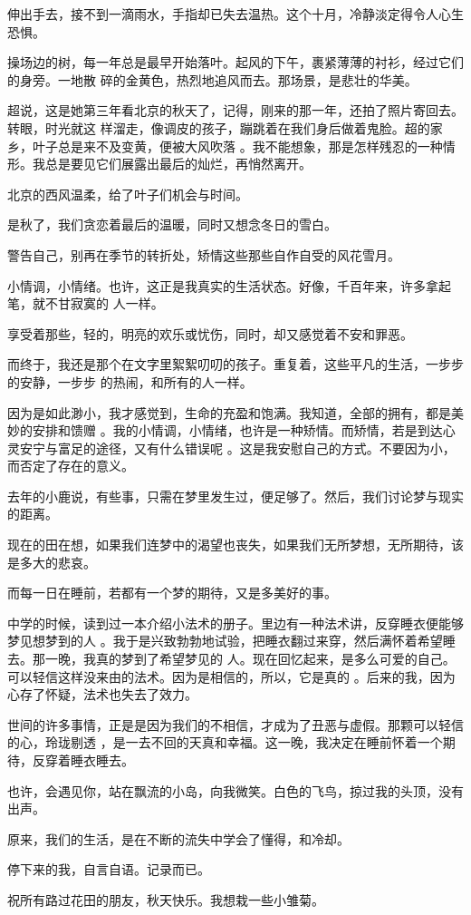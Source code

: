 \documentclass[12pt,a4paper]{article}
\begin{document}
		伸出手去，接不到一滴雨水，手指却已失去温热。这个十月，冷静淡定得令人心生恐惧。

		操场边的树，每一年总是最早开始落叶。起风的下午，裹紧薄薄的衬衫，经过它们的身旁。一地散
	碎的金黄色，热烈地追风而去。那场景，是悲壮的华美。

		超说，这是她第三年看北京的秋天了，记得，刚来的那一年，还拍了照片寄回去。转眼，时光就这
	样溜走，像调皮的孩子，蹦跳着在我们身后做着鬼脸。超的家乡，叶子总是来不及变黄，便被大风吹落
	。我不能想象，那是怎样残忍的一种情形。我总是要见它们展露出最后的灿烂，再悄然离开。

		北京的西风温柔，给了叶子们机会与时间。\par
		是秋了，我们贪恋着最后的温暖，同时又想念冬日的雪白。\par
		警告自己，别再在季节的转折处，矫情这些那些自作自受的风花雪月。

		小情调，小情绪。也许，这正是我真实的生活状态。好像，千百年来，许多拿起笔，就不甘寂寞的
	人一样。

		享受着那些，轻的，明亮的欢乐或忧伤，同时，却又感觉着不安和罪恶。

		而终于，我还是那个在文字里絮絮叨叨的孩子。重复着，这些平凡的生活，一步步的安静，一步步
	的热闹，和所有的人一样。

		因为是如此渺小，我才感觉到，生命的充盈和饱满。我知道，全部的拥有，都是美妙的安排和馈赠
	。我的小情调，小情绪，也许是一种矫情。而矫情，若是到达心灵安宁与富足的途径，又有什么错误呢
	。这是我安慰自己的方式。不要因为小，而否定了存在的意义。

		去年的小鹿说，有些事，只需在梦里发生过，便足够了。然后，我们讨论梦与现实的距离。\par
		现在的田在想，如果我们连梦中的渴望也丧失，如果我们无所梦想，无所期待，该是多大的悲哀。\par
		而每一日在睡前，若都有一个梦的期待，又是多美好的事。

		中学的时候，读到过一本介绍小法术的册子。里边有一种法术讲，反穿睡衣便能够梦见想梦到的人
	。我于是兴致勃勃地试验，把睡衣翻过来穿，然后满怀着希望睡去。那一晚，我真的梦到了希望梦见的
	人。现在回忆起来，是多么可爱的自己。可以轻信这样没来由的法术。因为是相信的，所以，它是真的
	。后来的我，因为心存了怀疑，法术也失去了效力。

		世间的许多事情，正是是因为我们的不相信，才成为了丑恶与虚假。那颗可以轻信的心，玲珑剔透
	，是一去不回的天真和幸福。这一晚，我决定在睡前怀着一个期待，反穿着睡衣睡去。

		也许，会遇见你，站在飘流的小岛，向我微笑。白色的飞鸟，掠过我的头顶，没有出声。\par
		原来，我们的生活，是在不断的流失中学会了懂得，和冷却。\par
		停下来的我，自言自语。记录而已。\par
		祝所有路过花田的朋友，秋天快乐。我想栽一些小雏菊。
\end{document}
